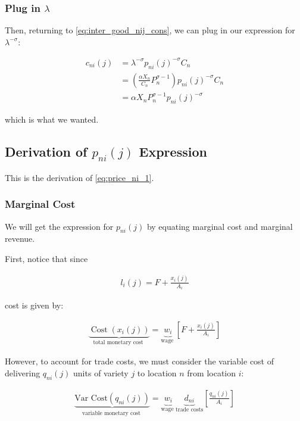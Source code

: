 \documentclass[10pt]{article}
\begin{document}
\subsubsection{Plug in $\lambda$}

Then, returning to \eqref{eq:inter_good_nij_cons}, we can plug in our expression for $\lambda^{-\sigma}$:

\begin{align}
    c_{n i}(j) &= \lambda^{-\sigma} p_{ni}(j)^{-\sigma} C_n \\
    &= \left(\frac{\alpha X_n}{C_n} P_n^{\sigma-1}\right) p_{ni}(j)^{-\sigma} C_n \\
    &= \alpha X_n P_n^{\sigma-1} p_{ni}(j)^{-\sigma}
\end{align}

which is what we wanted.

\subsection{Derivation of $p_{n i}(j)$ Expression}
\label{sec:price_ni_1}
This is the derivation of \eqref{eq:price_ni_1}.

\subsubsection{Marginal Cost}

We will get the expression 
for $p_{n i}(j)$ by equating 
marginal cost and marginal revenue.

First, notice that since 

\begin{align}
    l_i(j)=F+\frac{x_i(j)}{A_i}
\end{align}

cost is given by:

\begin{align}
    \underbrace{\operatorname{Cost}\left(x_i(j)\right)}_{\text {total monetary cost }}=\underbrace{w_i}_{\text {wage }}\left[F+\frac{x_i(j)}{A_i}\right] \label{eq:cost_xij}
\end{align}

However, to account for trade costs,
we must consider the variable cost of 
delivering $q_{ni}(j)$ units of variety $j$
to location $n$ from location $i$:

\begin{align}
    \underbrace{\text{Var Cost}\left(q_{ni}(j)\right)}_{\text {variable monetary cost }}=\underbrace{w_i}_{\text {wage }} \underbrace{d_{ni}}_{\text{trade costs}} \left[\frac{q_{ni}(j)}{A_i}\right] \label{eq:var_cost_qnij}
\end{align}
\end{document}
